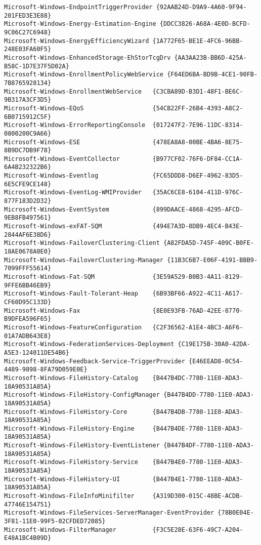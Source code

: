 \documentclass{report}
\begin{document}
\begin{lstlisting}[breaklines=true,basicstyle=\tiny]
Microsoft-Windows-EndpointTriggerProvider {92AAB24D-D9A9-4A60-9F94-201FED3E3E88}
Microsoft-Windows-Energy-Estimation-Engine {DDCC3826-A68A-4E0D-BCFD-9C06C27C6948}
Microsoft-Windows-EnergyEfficiencyWizard {1A772F65-BE1E-4FC6-96BB-248E03FA60F5}
Microsoft-Windows-EnhancedStorage-EhStorTcgDrv {AA3AA23B-BB6D-425A-B58C-1D7E37F5D02A}
Microsoft-Windows-EnrollmentPolicyWebService {F64ED6BA-BD9B-4CE1-90FB-7B8765928134}
Microsoft-Windows-EnrollmentWebService   {C3CBA89D-B3D1-48F1-BE6C-9B317A3CF3D5}
Microsoft-Windows-EQoS                   {54CB22FF-26B4-4393-A8C2-6B0715912C5F}
Microsoft-Windows-ErrorReportingConsole  {017247F2-7E96-11DC-8314-0800200C9A66}
Microsoft-Windows-ESE                    {478EA8A8-00BE-4BA6-8E75-8B9DC7DB9F78}
Microsoft-Windows-EventCollector         {B977CF02-76F6-DF84-CC1A-6A4B232322B6}
Microsoft-Windows-Eventlog               {FC65DDD8-D6EF-4962-83D5-6E5CFE9CE148}
Microsoft-Windows-EventLog-WMIProvider   {35AC6CE8-6104-411D-976C-877F183D2D32}
Microsoft-Windows-EventSystem            {899DAACE-4868-4295-AFCD-9EB8FB497561}
Microsoft-Windows-exFAT-SQM              {494E7A3D-8DB9-4EC4-B43E-2844AF6E38D6}
Microsoft-Windows-FailoverClustering-Client {A82FDA5D-745F-409C-B0FE-18AE0678A0E0}
Microsoft-Windows-FailoverClustering-Manager {11B3C6B7-E06F-4191-BBB9-7099FFF55614}
Microsoft-Windows-Fat-SQM                {3E59A529-B0B3-4A11-8129-9FFE6BB46EB9}
Microsoft-Windows-Fault-Tolerant-Heap    {6B93BF66-A922-4C11-A617-CF60D95C133D}
Microsoft-Windows-Fax                    {8E0E93FB-76AD-42EE-8770-B9DFEA596F65}
Microsoft-Windows-FeatureConfiguration   {C2F36562-A1E4-4BC3-A6F6-01A7ADB643E8}
Microsoft-Windows-FederationServices-Deployment {C19E175B-30A0-42DA-A5E3-124011DE54B6}
Microsoft-Windows-Feedback-Service-TriggerProvider {E46EEAD8-0C54-4489-9898-8FA79D059E0E}
Microsoft-Windows-FileHistory-Catalog    {B447B4DC-7780-11E0-ADA3-18A90531A85A}
Microsoft-Windows-FileHistory-ConfigManager {B447B4DD-7780-11E0-ADA3-18A90531A85A}
Microsoft-Windows-FileHistory-Core       {B447B4DB-7780-11E0-ADA3-18A90531A85A}
Microsoft-Windows-FileHistory-Engine     {B447B4DE-7780-11E0-ADA3-18A90531A85A}
Microsoft-Windows-FileHistory-EventListener {B447B4DF-7780-11E0-ADA3-18A90531A85A}
Microsoft-Windows-FileHistory-Service    {B447B4E0-7780-11E0-ADA3-18A90531A85A}
Microsoft-Windows-FileHistory-UI         {B447B4E1-7780-11E0-ADA3-18A90531A85A}
Microsoft-Windows-FileInfoMinifilter     {A319D300-015C-48BE-ACDB-47746E154751}
Microsoft-Windows-FileServices-ServerManager-EventProvider {78B0E04E-3F81-11E0-99F5-02CFDED72085}
Microsoft-Windows-FilterManager          {F3C5E28E-63F6-49C7-A204-E48A1BC4B09D}

\end{lstlisting}
\end{document}
